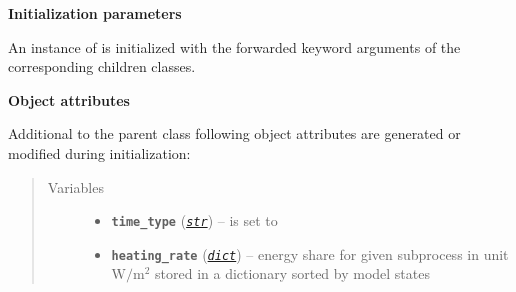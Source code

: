 \documentclass[a4paper,10pt,english]{sphinxmanual}
\begin{document}
\begin{fulllineitems}
\textbf{Initialization parameters}

An instance of  is initialized with the forwarded 
keyword arguments  of the corresponding children classes.

\textbf{Object attributes}

Additional to the parent class 
following object attributes are generated or modified during initialization:
\begin{quote}\begin{description}
\item[{Variables}] \leavevmode\begin{itemize}
\item {} 
\textbf{\texttt{time\_type}} (\href{http://docs.python.org/2.7/library/functions.html\#str}{\emph{\texttt{str}}}) -- is set to 

\item {} 
\textbf{\texttt{heating\_rate}} (\href{http://docs.python.org/2.7/library/stdtypes.html\#dict}{\emph{\texttt{dict}}}) -- energy share for given subprocess in unit 
\(\textrm{W}/ \textrm{m}^2\) stored 
in a dictionary sorted by model states

\end{itemize}

\end{description}\end{quote}

\end{fulllineitems}

\end{document}
